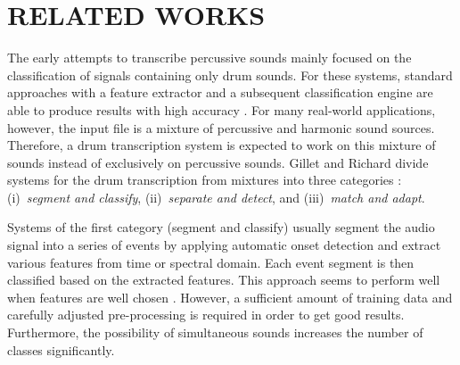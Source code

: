 \documentclass{article}
\begin{document}
\section{RELATED WORKS}\label{sec:related works}

The early attempts to transcribe percussive sounds mainly focused on the classification of signals containing only drum sounds. For these systems, standard approaches with a feature extractor and a subsequent classification engine are able to produce results with high accuracy \cite{%
herrera_automatic_2003}. 
For many real-world applications, however, the input file is a mixture of percussive and harmonic sound sources. Therefore, a drum transcription system is expected to work on this mixture of sounds instead of exclusively on percussive sounds. 
Gillet and Richard divide systems for the drum transcription from mixtures into three categories \cite{gillet_transcription_2008}: (i)~\textit{segment and classify}, (ii)~\textit{separate and detect}, and (iii)~\textit{match and adapt}.  

Systems of the first category (segment and classify) usually segment the audio signal into a series of events by applying automatic onset detection and extract various features from time or spectral domain. Each event segment is then classified based on the extracted features. 
This approach seems to perform well when features are well chosen \cite{gillet_automatic_2004, dittmar_drum_2005}. However, a sufficient amount of training data and carefully adjusted pre-processing is required in order to get good results. Furthermore, the possibility of  simultaneous sounds increases the number of  classes significantly.
\end{document}
